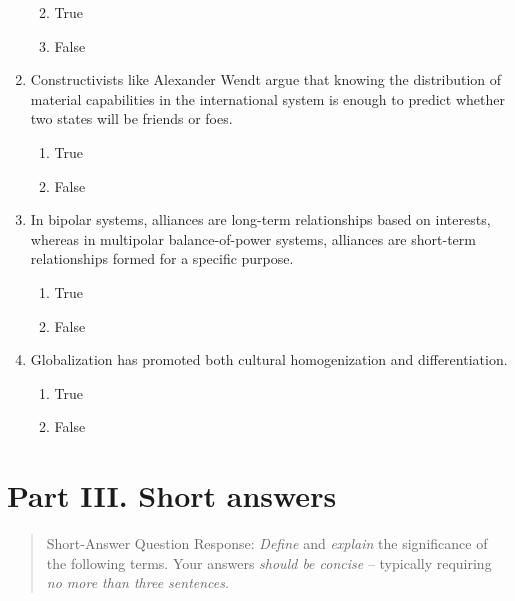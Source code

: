 \documentclass[
]{book}
\begin{document}
\begin{enumerate}
  \begin{enumerate}
  \def\labelenumii{\Alph{enumii}.}
  \item
    True
  \item
    False
  \end{enumerate}
\item
  Constructivists like Alexander Wendt argue that knowing the distribution of material capabilities in the international system is enough to predict whether two states will be friends or foes.

  \begin{enumerate}
  \def\labelenumii{\Alph{enumii}.}
  \item
    True
  \item
    False
  \end{enumerate}
\item
  In bipolar systems, alliances are long-term relationships based on interests, whereas in multipolar balance-of-power systems, alliances are short-term relationships formed for a specific purpose.

  \begin{enumerate}
  \def\labelenumii{\Alph{enumii}.}
  \item
    True
  \item
    False
  \end{enumerate}
\item
  Globalization has promoted both cultural homogenization and differentiation.

  \begin{enumerate}
  \def\labelenumii{\Alph{enumii}.}
  \item
    True
  \item
    False
  \end{enumerate}
\end{enumerate}

\hypertarget{part-iii.-short-answers}{%
\section*{Part III. Short answers}\label{part-iii.-short-answers}}

\begin{quote}
Short-Answer Question Response: \emph{Define} and \emph{explain} the significance of the following terms. Your answers \emph{should be concise} -- typically requiring \emph{no more than three sentences}.
\end{quote}
\end{document}
